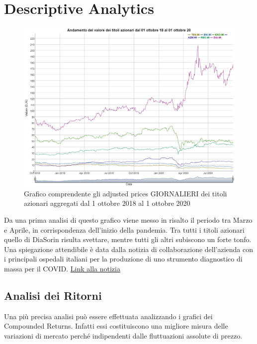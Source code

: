 \documentclass[12pt]{article}
\begin{document}
\section{Descriptive Analytics}
\FloatBarrier
\begin{figure}[!htb]
    \centering
    \includegraphics[width=1\textwidth]{immagini/allgraphs.png}
    \caption{Grafico comprendente gli adjusted prices GIORNALIERI dei titoli azionari aggregati dal 1 ottobre 2018 al 1 ottobre 2020}
\end{figure}
\FloatBarrier
Da una prima analisi di questo grafico viene messo in risalto il periodo tra Marzo e Aprile, in corrispondenza dell'inizio della pandemia. Tra tutti i titoli azionari quello di DiaSorin risulta svettare, mentre tutti gli altri subiscono un forte tonfo. Una spiegazione attendibile è data dalla notizia di collaborazione dell'azienda con i principali ospedali italiani per la produzione di uno strumento diagnostico di massa per il COVID.
\href{https://www.repubblica.it/economia/2020/03/10/news/coronavirus_diasorin_annuncia_entro_marzo_test_rapido_in_un_ora-250821897/}{Link alla notizia}
\newpage
\subsection{Analisi dei Ritorni}
Una più precisa analisi può essere effettuata analizzando i grafici dei Compounded Returns. Infatti essi costituiscono una migliore misura delle variazioni di mercato perché indipendenti dalle fluttuazioni assolute di prezzo.
\end{document}

